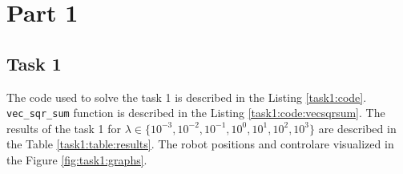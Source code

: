 
\section{Part 1}
\subsection{Task 1}

The code used to solve the task 1 is described in the Listing \ref{task1:code}. \lstinline{vec_sqr_sum} function is described in the Listing \ref{task1:code:vecsqrsum}. The results of the task 1 for $\lambda \in \{ 10^{-3}, 10^{-2}, 10^{-1}, 10^0, 10^1, 10^2, 10^3 \}$ are described in the Table \ref{task1:table:results}. The robot positions and controlare visualized in the Figure \ref{fig:task1:graphs}.

